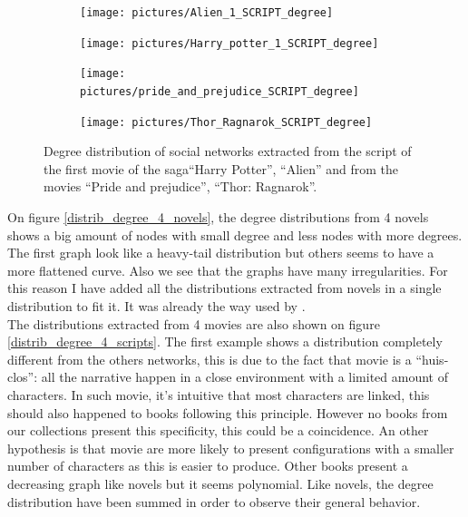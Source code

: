 \documentclass[a4paper, 12pt]{report}
\begin{document}
\begin{figure}
\label{distrib_degree_4_scripts}
\begin{subfigure}{.24\textwidth}
\centering
\texttt{[image: pictures/Alien\_1\_SCRIPT\_degree]}
\end{subfigure}
\hfill
\begin{subfigure}{.24\textwidth}
\centering
\texttt{[image: pictures/Harry\_potter\_1\_SCRIPT\_degree]}
\end{subfigure}
\hfill
\begin{subfigure}{.24\textwidth}
\centering
\texttt{[image: pictures/pride\_and\_prejudice\_SCRIPT\_degree]}
\end{subfigure}
\begin{subfigure}{.24\textwidth}
\centering
\texttt{[image: pictures/Thor\_Ragnarok\_SCRIPT\_degree]}
\end{subfigure}
\caption{Degree distribution of social networks extracted from the script of the first movie of the saga``Harry Potter'', ``Alien'' and from the movies ``Pride and prejudice'', ``Thor: Ragnarok''.}
\end{figure}

On figure \ref{distrib_degree_4_novels}, the degree distributions from 4 novels shows a big amount of nodes with small degree and less nodes with more degrees. The first graph look like a heavy-tail distribution but others seems to have a more flattened curve. Also we see that the graphs have many irregularities. For this reason I have added all the distributions extracted from novels in a single distribution to fit it. It was already the way used by \cite{original}.\\
The distributions extracted from 4 movies are also shown on figure \ref{distrib_degree_4_scripts}. The first example shows a distribution completely different from the others networks, this is due to the fact that movie is a ``huis-clos'': all the narrative happen in a close environment with a limited amount of characters. In such movie, it's intuitive that most characters are linked, this should also happened to books following this principle. However no books from our collections present this specificity, this could be a coincidence. An other hypothesis is that movie are more likely to present configurations with a smaller number of characters as this is easier to produce. Other books present a decreasing graph like novels but it seems polynomial. Like novels, the degree distribution have been summed in order to observe their general behavior.
\end{document}
